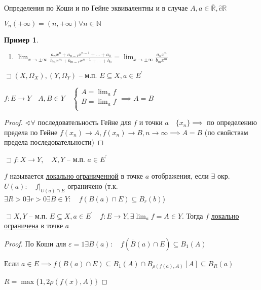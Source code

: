 \documentclass{book}
\newcommand\N{\ensuremath{\mathbb{N}}}
\newcommand\R{\ensuremath{\mathbb{R}}}
\newcommand{\p}[1]{#1^{\prime}}
\newcommand{\ov}[1]{\overline{#1}}
\theoremstyle{definition}
\newtheorem*{example}{Пример}
\begin{document}
\begin{problem}
Определения по Коши и по Гейне эквивалентны и в случае $A, a\in \ov {\R}, \widehat{e} {\R}$

$V_n(+\infty ) = (n, +\infty ) \forall n\in \N $
\end{problem}

\begin{example}
    \begin{enumerate}
        \item $\lim_{x \to \pm\infty } \frac{a_nx^n + a_{n-1}x^{n-1} + \ldots + a_0}{b_mx^m + b_{m-1}x^{n-1} + \ldots + b_0} = \lim_{x \to \pm\infty } \frac{a_n x^n}{b_mx^m}$
    \end{enumerate}
\end{example}

\begin{theorem}

    $\sqsupset (X, \Omega_X), (Y, \Omega_Y)$ -- м.п. $E\subseteq X, a\in \p E$

    $f:E\to Y\quad A, B\in Y\quad \begin{cases}
        A = \lim_af\\
        B = \lim_af\\
    \end{cases} \implies A=B$
\end{theorem}
\begin{proof}
    $\sphericalangle \forall $ последовательность Гейне для  $f$ и точки  $a\quad \{x_{n} \} \implies $ по определению предела по Гейне $f(x_{n} ) \to A, f(x_{n} )\to B, n\to \infty \implies A=B$ (по свойствам предела последовательности) 
\end{proof}

\begin{definition}
    $\sqsupset f: X\to Y ,\quad X, Y$ -- м.п. $a\in \p E$

    $f$ называется \underline{локально ограниченной} в точке $a$ отображения, если  $\exists $ окр. $U(a):\quad f|_{U(a)\cap E}$ ограничено (т.к. $\exists R>0\exists r>0\exists B\in Y:\quad f\left( B(a)\cap E \right) \subseteq B_r(b)$)
\end{definition}

\begin{theorem}

    $\sqsupset X, Y$ -- м.п. $E\subseteq X, a\in \p E\quad f:E\to Y, \exists \lim_af =A\in Y$. Тогда $f$ \underline{локально ограничена} в точке $a$
\end{theorem}
\begin{proof}
    По Коши для $\varepsilon=1\exists B(a):\quad f\left( \overset{\cdot }B(a)\cap E \right) \subseteq B_1(A)$

    Если $a\in E \implies f\left( B(a)\cap E \right) \subseteq B_1(A)\cap B_{\rho(f(a), A)}[A] \subseteq B_R(a)\quad$ 

    $ R = \max\{1, 2\rho(f(x), A)\}$
\end{proof}
\end{document}
